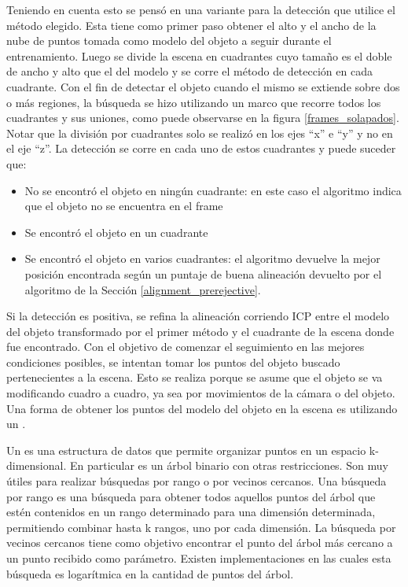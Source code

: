 Teniendo en cuenta esto se pensó en una variante para la detección que utilice el método elegido. Esta tiene como primer paso obtener el alto y el ancho de la nube de puntos tomada como modelo del objeto a seguir durante el entrenamiento. Luego se divide la escena en cuadrantes cuyo tamaño es el doble de ancho y alto que el del modelo y se corre el método de detección en cada cuadrante. Con el fin de detectar el objeto cuando el mismo se extiende sobre dos o más regiones, la búsqueda se hizo utilizando un marco que recorre todos los cuadrantes y sus uniones, como puede observarse en la figura \ref{frames_solapados}. Notar que la división por cuadrantes solo se realizó en los ejes ``x'' e ``y'' y no en el eje ``z''. La detección se corre en cada uno de estos cuadrantes y puede suceder que:
\begin{itemize}
	\item No se encontró el objeto en ningún cuadrante: en este caso el algoritmo indica que el objeto no se encuentra en el frame
	\item Se encontró el objeto en un cuadrante
	\item Se encontró el objeto en varios cuadrantes: el algoritmo devuelve la mejor posición encontrada según un puntaje de buena alineación devuelto por el algoritmo de la Sección \ref{alignment_prerejective}.
\end{itemize}

Si la detección es positiva, se refina la alineación corriendo ICP entre el modelo del objeto transformado por el primer método y el cuadrante de la escena donde fue encontrado. Con el objetivo de comenzar el seguimiento en las mejores condiciones posibles, se intentan tomar los puntos del objeto buscado pertenecientes a la escena. Esto se realiza porque se asume que el objeto se va modificando cuadro a cuadro, ya sea por movimientos de la cámara o del objeto. Una forma de obtener los puntos del modelo del objeto en la escena es utilizando un \kdt.

Un \kdt es una estructura de datos que permite organizar puntos en un espacio k-dimensional. En particular es un árbol binario con otras restricciones. Son muy útiles para realizar búsquedas por rango o por vecinos cercanos. Una búsqueda por rango es una búsqueda para obtener todos aquellos puntos del árbol que estén contenidos en un rango determinado para una dimensión determinada, permitiendo combinar hasta k rangos, uno por cada dimensión. La búsqueda por vecinos cercanos tiene como objetivo encontrar el punto del árbol más cercano a un punto recibido como parámetro. Existen implementaciones en las cuales esta búsqueda es logarítmica en la cantidad de puntos del árbol.

